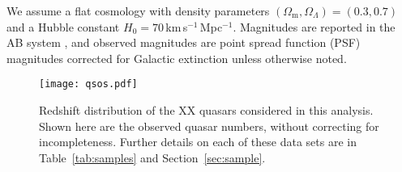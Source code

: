 \documentclass[a4paper,fleqn,usenatbib]{mnras}
\begin{document}
We assume a flat cosmology with density parameters
$\left(\Omega_\mathrm{m},\Omega_\Lambda\right)=\left(0.3,0.7\right)$
and a Hubble constant $H_0=70$\,km\,s$^{-1}$\,Mpc$^{-1}$. Magnitudes
are reported in the AB system \citep{1983ApJ...266..713O}, and
observed magnitudes are point spread function (PSF) magnitudes
\citep{2002AJ....123..485S} corrected for Galactic extinction
\citep{1998ApJ...500..525S} unless otherwise noted.

\begin{figure*}
  \begin{center}
    \texttt{[image: qsos.pdf]}
  \end{center}
  \caption{Redshift distribution of the XX quasars considered in this
    analysis.  Shown here are the observed quasar numbers, without
    correcting for incompleteness.  Further details on each of these
    data sets are in Table~\ref{tab:samples} and
    Section~\ref{sec:sample}.}
  \label{fig:qsos}
\end{figure*}
\end{document}

